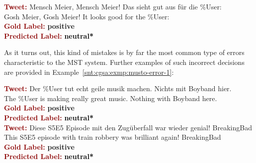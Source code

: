 \begin{example}\label{snt:cgsa:exmp:musto-error-0}
  \noindent\textup{\bfseries\textcolor{darkred}{Tweet:}} {\upshape
    Mensch Meier, Mensch Meier! Das sieht gut aus f\"ur
    die \%User:}\\
  \noindent Gosh Meier, Gosh Meier! It looks good for
  the \%User:\\[\exampleSep]
  \noindent\textup{\bfseries\textcolor{darkred}{Gold Label:}}\hspace*{4.3em}\textbf{%
    \upshape\textcolor{green3}{positive}}\\
 \noindent\textup{\bfseries\textcolor{darkred}{Predicted Label:}}\hspace*{2em}\textbf{%
    \upshape\textcolor{black}{neutral*}}
\end{example}

\noindent As it turns out, this kind of mistakes is by far the most
common type of errors characteristic to the MST system.  Further
examples of such incorrect decisions are provided in
Example~\ref{snt:cgsa:exmp:musto-error-1}:
\begin{example}\label{snt:cgsa:exmp:musto-error-1}
  \noindent\textup{\bfseries\textcolor{darkred}{Tweet:}} {\upshape
    Der \%User tut echt geile musik machen. Nichts mit Boyband hier.}\\
  \noindent The \%User is making really great music. Nothing with Boyband here.\\[\exampleSep]
  \noindent\textup{\bfseries\textcolor{darkred}{Gold Label:}}\hspace*{4.3em}\textbf{%
    \upshape\textcolor{green3}{positive}}\\
 \noindent\textup{\bfseries\textcolor{darkred}{Predicted Label:}}\hspace*{2em}\textbf{%
    \upshape\textcolor{black}{neutral*}}\\[2\exampleSep]
  \noindent\textup{\bfseries\textcolor{darkred}{Tweet:}} {\upshape
    Diese S5E5 Episode mit den Zug\"uberfall war wieder genial! BreakingBad}\\
  \noindent This S5E5 episode with train robbery was brilliant again! BreakingBad\\[\exampleSep]
  \noindent\textup{\bfseries\textcolor{darkred}{Gold Label:}}\hspace*{4.3em}\textbf{%
    \upshape\textcolor{green3}{positive}}\\
 \noindent\textup{\bfseries\textcolor{darkred}{Predicted Label:}}\hspace*{2em}\textbf{%
    \upshape\textcolor{black}{neutral*}}
\end{example}

